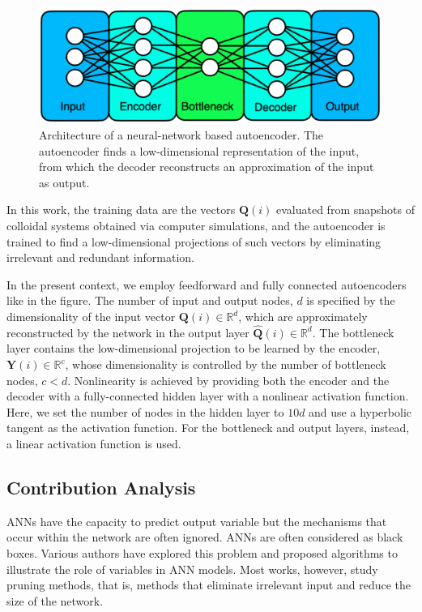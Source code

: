 \documentclass{report}
\begin{document}
\begin{figure}
	\centering
	\includegraphics[scale = 0.5]{images/autoencoder.png}
	\caption{Architecture of a neural-network based autoencoder. The autoencoder finds a low-dimensional representation of the input, from which the decoder reconstructs an approximation of the input as output.}	
\end{figure}


In this work, the training data are the vectors $\bm{Q}(i)$ evaluated from snapshots of colloidal systems obtained via computer simulations, and the autoencoder is trained to find a low-dimensional projections of such vectors by eliminating irrelevant and redundant information. 

In the present context, we employ feedforward and fully connected autoencoders like in the figure. The number of input and output nodes, $d$ is specified by the dimensionality of the input vector $\bm{Q}(i)\in\mathbb{R}^d$, which are approximately reconstructed by the network in the output layer $\hat{\bm{Q}}(i)\in\mathbb{R}^d$. The bottleneck layer contains the low-dimensional projection to be learned by the encoder, $\bm{Y}(i)\in\mathbb{R}^c$, whose dimensionality is controlled by the number of bottleneck nodes, $c<d$. Nonlinearity is achieved by providing both the encoder and the decoder with a fully-connected hidden layer with a nonlinear activation function. Here, we set the number of nodes in the hidden layer to $10d$ and use a hyperbolic tangent as the activation function. For the bottleneck and output layers, instead, a linear activation function is used.


\subsection{Contribution Analysis}

ANNs have the capacity to predict output variable but the mechanisms that occur within the network are often ignored. ANNs are often considered as black boxes. Various authors have explored this problem and proposed algorithms to illustrate the role of variables in ANN models. Most works, however, study pruning methods, that is, methods that eliminate irrelevant input and reduce the size of the network. 
\end{document}
